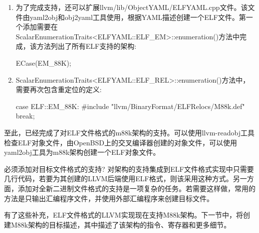 \begin{enumerate}
\item
为了完成支持，还可以扩展llvm/lib/ObjectYAML/ELFYAML.cpp文件。该文件由yaml2obj和obj2yaml工具使用，根据YAML描述创建一个ELF文件。第一个添加需要在ScalarEnumerationTraits<ELFYAML::ELF\_EM>::enumeration()方法中完成，该方法列出了所有ELF支持的架构:

\begin{cpp}
ECase(EM_88K);
\end{cpp}

\item
ScalarEnumerationTraits<ELFYAML::ELF\_REL>::enumeration()方法中，需要再次包含重定位的定义:

\begin{cpp}
    case ELF::EM_88K:
#include "llvm/BinaryFormat/ELFRelocs/M88k.def"
    break;
\end{cpp}
\end{enumerate}

至此，已经完成了对ELF文件格式的m88k架构的支持。可以使用llvm-readobj工具检查ELF对象文件，由OpenBSD上的交叉编译器创建的对象文件，可以使用yaml2obj工具为m88k架构创建一个ELF对象文件。

\begin{myNotic}{必须添加对目标文件格式的支持?}
对架构的支持集成到ELF文件格式实现中只需要几行代码，若要为其创建的LLVM后端使用ELF格式，则该采用这种方式。另一方面，添加对全新二进制文件格式的支持是一项复杂的任务。若需要这样做，常用的方法是只输出汇编程序文件，并使用外部汇编程序来创建目标文件。
\end{myNotic}

有了这些补充，ELF文件格式的LLVM实现现在支持M88k架构。下一节中，将创建M88k架构的目标描述，其中描述了该架构的指令、寄存器和更多细节。

















